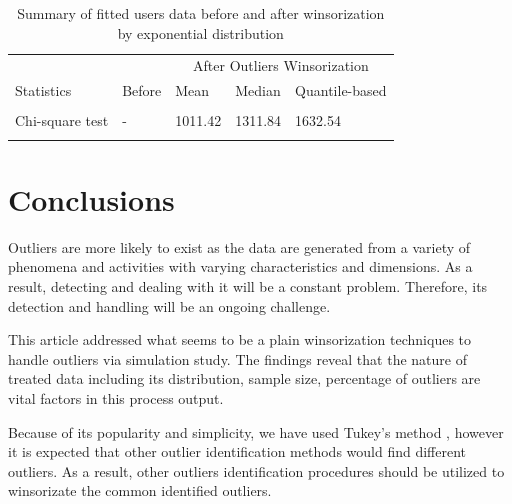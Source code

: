 \documentclass[
]{article}
\begin{document}
\begin{CodeChunk}
\begin{table}[H]

\caption{\label{tab:unnamed-chunk-10}Summary of fitted users data before and after winsorization by exponential distribution}
\centering
\begin{tabular}[t]{l|l|l|l|l}
\hline
\multicolumn{1}{c|}{ } & \multicolumn{1}{c|}{ } & \multicolumn{3}{c}{After Outliers Winsorization} \\
\cline{3-5}
Statistics & Before & Mean & Median & Quantile-based\\
\hline
\cellcolor{gray!6}{Proportion of fitted data} & \cellcolor{gray!6}{0.31} & \cellcolor{gray!6}{0.67} & \cellcolor{gray!6}{0.61} & \cellcolor{gray!6}{0.56}\\
\hline
Chi-square test & - & 1011.42 & 1311.84 & 1632.54\\
\hline
\cellcolor{gray!6}{p-value} & \cellcolor{gray!6}{-} & \cellcolor{gray!6}{0.00} & \cellcolor{gray!6}{0.00} & \cellcolor{gray!6}{0.00}\\
\hline
\end{tabular}
\end{table}

\end{CodeChunk}

\hypertarget{conclusions}{%
\section{Conclusions}\label{conclusions}}

Outliers are more likely to exist as the data are generated from a
variety of phenomena and activities with varying characteristics and
dimensions. As a result, detecting and dealing with it will be a
constant problem. Therefore, its detection and handling will be an
ongoing challenge.

This article addressed what seems to be a plain winsorization techniques
to handle outliers via simulation study. The findings reveal that the
nature of treated data including its distribution, sample size,
percentage of outliers are vital factors in this process output.

Because of its popularity and simplicity, we have used Tukey's method ,
however it is expected that other outlier identification methods would
find different outliers. As a result, other outliers identification
procedures should be utilized to winsorizate the common identified
outliers.

\pagebreak
\end{document}
